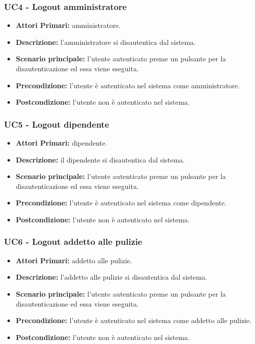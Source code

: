 \subsubsection{ UC4 - Logout amministratore}
\begin{itemize}
	\item\textbf{Attori Primari:} 
	amministratore.
	\item\textbf{Descrizione:} 
	l'amministratore si disautentica dal sistema.
	\item\textbf{Scenario principale:} 
	l'utente autenticato preme un pulsante per la disautenticazione ed essa viene eseguita.
	\item\textbf{Precondizione:} 
	l'utente è autenticato nel sistema come amministratore.
	\item\textbf{Postcondizione:}
	l'utente non è autenticato nel sistema.
\end{itemize}

\subsubsection{ UC5 - Logout dipendente}
\begin{itemize}
	\item\textbf{Attori Primari:} 
	dipendente.
	\item\textbf{Descrizione:} 
	il dipendente si disautentica dal sistema.
	\item\textbf{Scenario principale:} 
	l'utente autenticato preme un pulsante per la disautenticazione ed essa viene eseguita.
	\item\textbf{Precondizione:} 
	l'utente è autenticato nel sistema come dipendente.
	\item\textbf{Postcondizione:}
	l'utente non è autenticato nel sistema.
\end{itemize}

\subsubsection{ UC6 - Logout addetto alle pulizie}
\begin{itemize}
	\item\textbf{Attori Primari:} 
	addetto alle pulizie.
	\item\textbf{Descrizione:} 
	l'addetto alle pulizie si disautentica dal sistema.
	\item\textbf{Scenario principale:} 
	l'utente autenticato preme un pulsante per la disautenticazione ed essa viene eseguita.
	\item\textbf{Precondizione:} 
	l'utente è autenticato nel sistema come addetto alle pulizie.
	\item\textbf{Postcondizione:}
	l'utente non è autenticato nel sistema.
\end{itemize}


